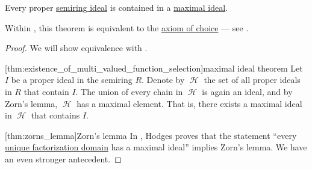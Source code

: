 \begin{theorem}\label{thm:maximal_ideal_theorem}
  Every proper \hyperref[def:semiring_ideal]{semiring ideal} is contained in a \hyperref[def:derived_semiring_ideals/maximal]{maximal ideal}.

  Within \hyperref[def:zfc]{}, this theorem is equivalent to the \hyperref[def:zfc/choice]{axiom of choice} --- see .
\end{theorem}
\begin{proof}
  We will show equivalence with .

  [thm:existence_of_multi_valued_function_selection]{maximal ideal theorem} Let \( I \) be a proper ideal in the semiring \( R \). Denote by \( \mscrH \) the set of all proper ideals in \( R \) that contain \( I \). The union of every chain in \( \mscrH \) is again an ideal, and by Zorn's lemma, \( \mscrH \) has a maximal element. That is, there exists a maximal ideal in \( \mscrH \) that contains \( I \).

  [thm:zorns_lemma]{Zorn's lemma} In \cite{Hodges1979}, Hodges proves that the statement \enquote{every \hyperref[def:unique_factorization_domain]{unique factorization domain} has a maximal ideal} implies Zorn's lemma. We have an even stronger antecedent.
\end{proof}
